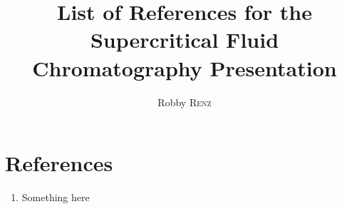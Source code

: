 \documentclass[12pt, a4paper]{article}
\author{Robby \textsc{Renz}}
\title{List of References for the Supercritical Fluid Chromatography Presentation}
\begin{document}
\maketitle

\section{References}

\begin{enumerate}
	\item Something here
\end{enumerate}
\end{document}

